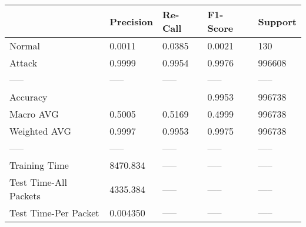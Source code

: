 \begin{tabular}{lllll}
\toprule
{} & Precision & Re-Call & F1-Score & Support \\
\midrule
Normal                &    0.0011 &  0.0385 &   0.0021 &     130 \\
Attack                &    0.9999 &  0.9954 &   0.9976 &  996608 \\
-----                 &     ----- &   ----- &    ----- &   ----- \\
Accuracy              &           &         &   0.9953 &  996738 \\
Macro AVG             &    0.5005 &  0.5169 &   0.4999 &  996738 \\
Weighted AVG          &    0.9997 &  0.9953 &   0.9975 &  996738 \\
-----                 &     ----- &   ----- &    ----- &   ----- \\
Training Time         &  8470.834 &   ----- &    ----- &   ----- \\
Test Time-All Packets &  4335.384 &   ----- &    ----- &   ----- \\
Test Time-Per Packet  &  0.004350 &   ----- &    ----- &   ----- \\
\bottomrule
\end{tabular}

